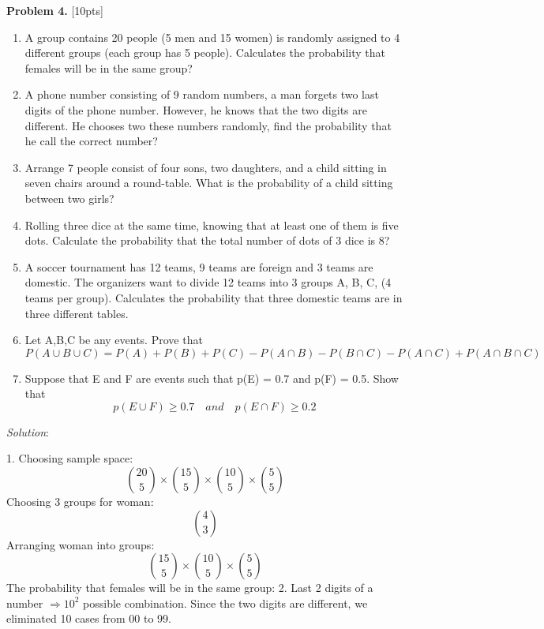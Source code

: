 \documentclass[12pt]{amsart}
\begin{document}
\textbf{Problem 4. }[10pts]
\begin{enumerate}
    \item A group contains 20 people (5 men and 15 women) is randomly assigned to 4 different groups (each
    group has 5 people). Calculates the probability that females will be in the same group?
    \bigskip
    
    \item A phone number consisting of 9 random numbers, a man forgets two last digits of the phone number.
    However, he knows that the two digits are different. He chooses two these numbers randomly, find the
    probability that he call the correct number?
    \bigskip
    
    \item Arrange 7 people consist of four sons, two daughters, and a child sitting in seven chairs around a round-table. What is the probability of a child sitting between two girls?
    \bigskip
    
    \item Rolling three dice at the same time, knowing that at least one of them is five dots. Calculate the probability that the total number of dots of 3 dice is 8?
    \bigskip
    
    \item A soccer tournament has 12 teams, 9 teams are foreign and 3 teams are domestic. The organizers want
to divide 12 teams into 3 groups A, B, C, (4 teams per group). Calculates the probability that three
domestic teams are in three different tables.
    \bigskip
    
    \item Let A,B,C be any events. Prove that
    \[ P(A\cup B\cup C) = P(A) + P(B) + P(C) -P(A\cap B) - P(B \cap C) - P(A \cap C) + P(A\cap B \cap C)\]
    \medskip
    
    \item Suppose that E and F are events such that p(E) = 0.7 and p(F) = 0.5. Show that \[p(E\cup F) \geq 0.7 \quad and \quad p(E\cap F) \geq 0.2 \]
\end{enumerate}
\bigskip 

\textit{Solution}:

1. Choosing sample space: \[\binom{20}{5} \times \binom{15}{5} \times \binom{10}{5} \times \binom{5}{5}\]
Choosing 3 groups for woman: \[\binom{4}{3}\]
Arranging woman into groups: \[\binom{15}{5} \times \binom{10}{5} \times \binom{5}{5}\]
The probability that females will be in the same group:
2. Last 2 digits of a number  $\displaystyle \Rightarrow 10^2$ possible combination. Since the two digits are different, we eliminated 10 cases from 00 to 99. 
\end{document}
